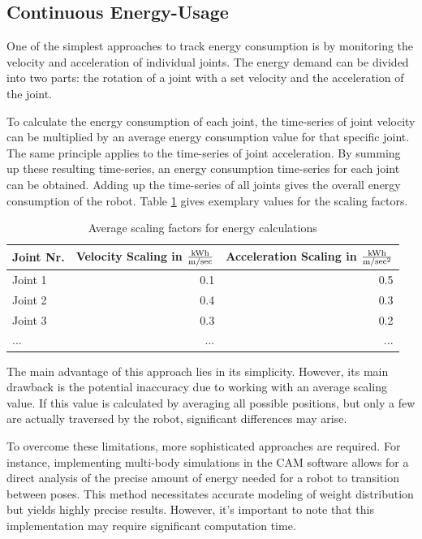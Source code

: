 \subsection{Continuous Energy-Usage}
One of the simplest approaches to track energy consumption is by monitoring the velocity and acceleration of individual joints. The energy demand can be divided into two parts: the rotation of a joint with a set velocity and the acceleration of the joint.

To calculate the energy consumption of each joint, the time-series of joint velocity can be multiplied by an average energy consumption value for that specific joint. The same principle applies to the time-series of joint acceleration. By summing up these resulting time-series, an energy consumption time-series for each joint can be obtained. Adding up the time-series of all joints gives the overall energy consumption of the robot. Table \ref{scalers} gives exemplary  values for the scaling factors.\newline


\begin{table}[H]
	\centering
	\begin{tabular}{||l|r|r||}
		Joint Nr.  & Velocity Scaling in \(\frac{\si[per-mode=symbol]{\kWh}}{\si[per-mode=symbol]{\m\per\sec }}\)& Acceleration Scaling in \(\frac{\si[per-mode=symbol]{\kWh}}{\si[per-mode=symbol]{\m\per\sec\squared }}\) \\
		\hline
		\hline
		\hline
		Joint 1	& 0.1 & 0.5\\
		Joint 2	&  0.4& 0.3 \\
		Joint 3	& 0.3& 0.2\\
		...& ...& ...\\
		
		\hline
		\hline
	\end{tabular}
	
	\caption{Average scaling factors for energy calculations}
	\label{scalers}
\end{table}


The main advantage of this approach lies in its simplicity. However, its main drawback is the potential inaccuracy due to working with an average scaling value. If this value is calculated by averaging all possible positions, but only a few are actually traversed by the robot, significant differences may arise.


To overcome these limitations, more sophisticated approaches are required. For instance, implementing multi-body simulations in the CAM software allows for a direct analysis of the precise amount of energy needed for a robot to transition between poses. This method necessitates accurate modeling of weight distribution but yields highly precise results. However, it's important to note that this implementation may require significant computation time.


